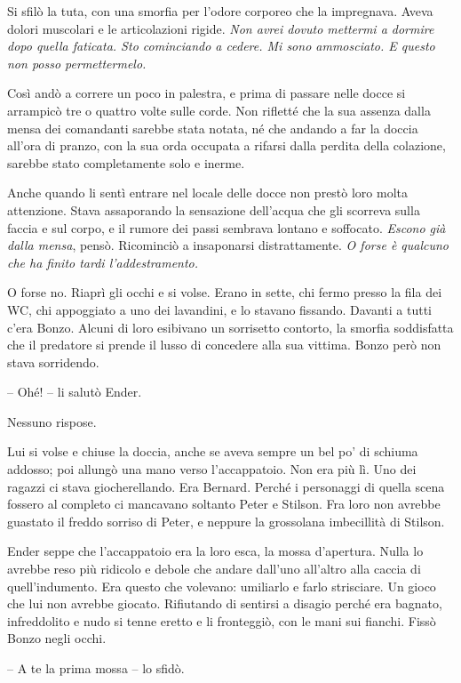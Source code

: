 {Si sfilò la tuta, con una smorfia per l'odore corporeo che la
	impregnava. Aveva dolori muscolari e le articolazioni rigide. \emph{Non
		avrei dovuto mettermi a dormire dopo quella faticata. Sto cominciando a
		cedere. Mi sono ammosciato. E questo non posso permettermelo.}}

{Così andò a correre un poco in palestra, e prima di passare nelle docce
	si arrampicò tre o quattro volte sulle corde. Non rifletté che la sua
	assenza dalla mensa dei comandanti sarebbe stata notata, né che andando
	a far la doccia all'ora di pranzo, con la sua orda occupata a rifarsi
	dalla perdita della colazione, sarebbe stato completamente solo e
	inerme.}

{Anche quando li sentì entrare nel locale delle docce non prestò loro
	molta attenzione. Stava assaporando la sensazione dell'acqua che gli
	scorreva sulla faccia e sul corpo, e il rumore dei passi sembrava
	lontano e soffocato. \emph{Escono già dalla mensa}, \emph{} pensò.
	Ricominciò a insaponarsi distrattamente. \emph{O forse è qualcuno che ha
		finito tardi l'addestramento.}}

{O forse no. Riaprì gli occhi e si volse. Erano in sette, chi fermo
	presso la fila dei WC, chi appoggiato a uno dei lavandini, e lo stavano
	fissando. Davanti a tutti c'era Bonzo. Alcuni di loro esibivano un
	sorrisetto contorto, la smorfia soddisfatta che il predatore si prende
	il lusso di concedere alla sua vittima. Bonzo però non stava
	sorridendo.}

{-- Ohé! -- li salutò Ender.}

{Nessuno rispose.}

{Lui si volse e chiuse la doccia, anche se aveva sempre un bel po' di
	schiuma addosso; poi allungò una mano verso l'accappatoio. Non era più
	lì. Uno dei ragazzi ci stava giocherellando. Era Bernard. Perché i
	personaggi di quella scena fossero al completo ci mancavano soltanto
	Peter e Stilson. Fra loro non avrebbe guastato il freddo sorriso di
	Peter, e neppure la grossolana imbecillità di Stilson.}

{Ender seppe che l'accappatoio era la loro esca, la mossa d'apertura.
	Nulla lo avrebbe reso più ridicolo e debole che andare dall'uno
	all'altro alla caccia di quell'indumento. Era questo che volevano:
	umiliarlo e farlo strisciare. Un gioco che lui non avrebbe giocato.
	Rifiutando di sentirsi a disagio perché era bagnato, infreddolito e nudo
	si tenne eretto e li fronteggiò, con le mani sui fianchi. Fissò Bonzo
	negli occhi.}

{-- A te la prima mossa -- lo sfidò.}


